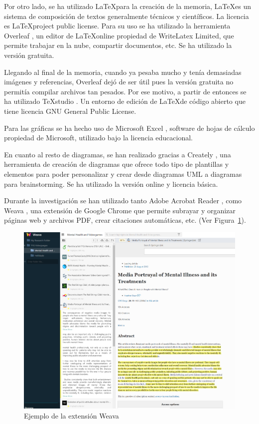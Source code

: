 \documentclass[12pt, a4paper,twoside,titlepage]{book}
\begin{document}
Por otro lado, se ha utilizado \LaTeX para la creación de la memoria, \LaTeX es un sistema de composición de textos generalmente técnicos y científicos. La licencia es \LaTeX project public license. Para su uso se ha utilizado la herramienta Overleaf \cite{overleaf}, un editor de \LaTeX online propiedad de WriteLatex Limited, que permite trabajar en la nube, compartir documentos, etc. Se ha utilizado la versión gratuita. 

Llegando al final de la memoria, cuando ya pesaba mucho y tenía demasiadas imágenes y referencias, Overleaf dejó de ser útil pues la versión gratuita no permitía compilar archivos tan pesados. Por ese motivo, a partir de entonces se ha utilizado TeXstudio \cite{texstudio}. Un entorno de edición de \LaTeX de código abierto que tiene licencia GNU General Public License. 

Para las gráficas se ha hecho uso de Microsoft Excel \cite{excel}, software de hojas de cálculo propiedad de Microsoft, utilizado bajo la licencia educacional. 

En cuanto al resto de diagramas, se han realizado gracias a Creately \cite{creately}, una herramienta de creación de diagramas que ofrece todo tipo de plantillas y elementos para poder personalizar y crear desde diagramas UML a diagramas para brainstorming. Se ha utilizado la versión online y licencia básica. 

Durante la investigación se han utilizado tanto Adobe Acrobat Reader \cite{adobeacrobat}, como Weava \cite{weava}, una extensión de Google Chrome que permite subrayar y organizar páginas web y archivos PDF, crear citaciones automáticas, etc. (Ver Figura~\ref{fig:weava}). 

\begin{figure}
    \centering
    \includegraphics[width=.8\linewidth]{TGF/Extra/Weava.png}
    \caption{Ejemplo de la extensión Weava}
    \label{fig:weava}
\end{figure}
\end{document}
